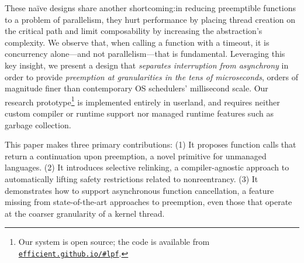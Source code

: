 These na\"ive designs share another shortcoming:\@ in reducing
preemptible functions to a problem of parallelism, they hurt performance by placing
thread creation on the critical path and limit composability by increasing the
abstraction's complexity.  We observe that, when calling a function with
a timeout, it is concurrency alone---and not parallelism---that is fundamental.
Leveraging this key insight, we present a design that \textit{separates interruption
from asynchrony} in order to provide \textit{preemption at granularities in the tens
of microseconds}, orders of magnitude finer than contemporary OS schedulers'
millisecond scale.  Our research prototype\footnote{Our system is open source; the
code is available from
\href{https://efficient.github.io/\#lpf}{\texttt{efficient.github.io/\#lpf}}.} is
implemented entirely in userland, and
requires neither custom compiler or runtime support nor managed runtime features such
as garbage collection.

This paper makes three primary contributions:  (1) It proposes function calls that
return a continuation upon preemption, a novel primitive for unmanaged languages.
(2) It introduces selective relinking, a compiler-agnostic approach to automatically
lifting safety restrictions related to nonreentrancy.  (3) It demonstrates how to
support asynchronous function cancellation, a feature missing from state-of-the-art
approaches to preemption, even those that operate at the coarser granularity of a
kernel thread.
